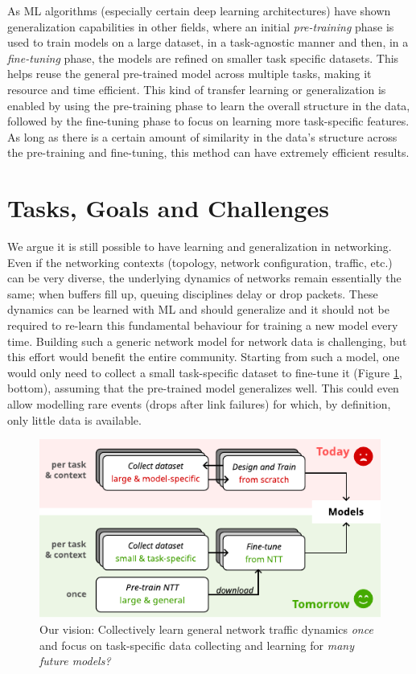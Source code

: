As ML algorithms (especially certain deep learning architectures) have shown generalization capabilities\cite{generalizingdnn} in other fields, where an initial \emph{pre-training} phase is used to train models on a large dataset, in a task-agnostic manner and then, in a \emph{fine-tuning} phase, the models are refined on smaller task specific datasets. This helps reuse the general pre-trained model across multiple tasks, making it resource and time efficient. This kind of transfer learning or generalization\cite{transferng} is enabled by using the pre-training phase to learn the overall structure in the data, followed by the fine-tuning phase to focus on learning more task-specific features. As long as there is a certain amount of similarity in the data's structure across the pre-training and fine-tuning, this method can have extremely efficient results.

\section{Tasks, Goals and Challenges}
\label{sec:task}

We argue it is still possible to have learning and generalization in networking. Even if the networking contexts (topology, network configuration, traffic, etc.) can be very diverse, the underlying dynamics of networks remain essentially the same; \eg when buffers fill up, queuing disciplines delay or drop packets. These dynamics can be learned with ML and should generalize and it should not be required to re-learn this fundamental behaviour for training a new model every time. Building such a generic network model for network data is challenging, but this effort would benefit the entire community. Starting from such a model, one would only need to collect a small task-specific dataset to fine-tune it (Figure \ref{fig:vision}, bottom), assuming that the pre-trained model generalizes well. This could even allow modelling rare events (\eg drops after link failures) for which, by definition, only little data is available.

\begin{figure}
    \centering
    \includegraphics[scale=1.3]{figures/vision}
    \caption{Our vision: Collectively learn general network traffic dynamics \emph{once} and focus on task-specific data collecting and learning  for \emph{many future models?}}
    \label{fig:vision}
\end{figure}

